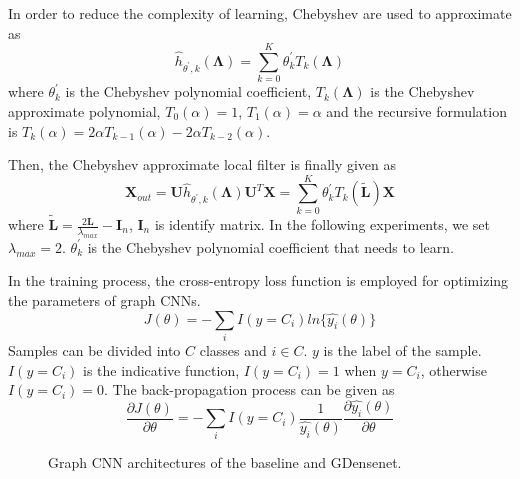 \documentclass[journal]{IEEEtran}
\begin{document}
In order to reduce the complexity of learning, Chebyshev are used to approximate as
\begin{equation}
\hat{h}_{\theta^{'},k} (\mathbf{\Lambda})
= \sum_{k=0}^K {\theta^{'}_k} T_k ( \mathbf{\Lambda} )
\end{equation}
where $\theta^{'}_k$ is the Chebyshev polynomial coefficient, $T_k ( \mathbf{\Lambda})$ is the Chebyshev approximate polynomial, $T_0 (\alpha) = 1$, $T_1 (\alpha) = \alpha$ and the recursive formulation is $T_k (\alpha) = 2 \alpha T_{k-1} (\alpha) - 2 \alpha T_{k-2} (\alpha)$.

Then, the Chebyshev approximate local filter is finally given as
\begin{equation}
\mathbf{X}_{out} = \mathbf{U} \hat{h}_{\theta^{'},k}( \mathbf{\Lambda}) \mathbf{U}^T \mathbf{X}
=\sum_{k=0}^K {\theta^{'}_k} T_k ( \mathbf{\tilde{L}} )\mathbf{X}
\label{cheby}
\end{equation}
where $ \mathbf{\tilde{L}} = \frac{2\mathbf{L}}{\lambda_{max}}-\mathbf{I}_{n} $, $\mathbf{I}_{n}$ is identify matrix. In the following experiments, we set $\lambda_{max}=2$.  $\theta^{'}_k$ is the Chebyshev polynomial coefficient that needs to learn.


In the training process, the cross-entropy loss function is employed for optimizing the parameters of graph CNNs.
\begin{equation}
J(\theta)= - \sum_{i}I(y= C_{i}) ln \{\hat{y_i}(\theta) \}
\end{equation}
Samples can be divided into $C$ classes and $ i\in C$. $y$ is the label of the sample. $I(y = C_{i})$ is the indicative function,  $I(y = C_{i})=1$ when $y = C_{i}$, otherwise $I(y = C_{i})=0$.
The back-propagation process can be given as
\begin{equation}
\frac{\partial J(\theta)}{\partial \theta} = - \sum_{i} I(y = C_{i} ) \frac{1}{\hat{y_i}(\theta)} \frac{\partial \hat{y_i}(\theta)}{\partial \theta}
\end{equation}




\begin{figure}[t]
	\centering
	\vspace{-1em}
	\caption{Graph CNN architectures of the baseline and G\underline{\hspace{0.5em}}Densenet.}
	\label{sturcture2}
\end{figure}
\end{document}
